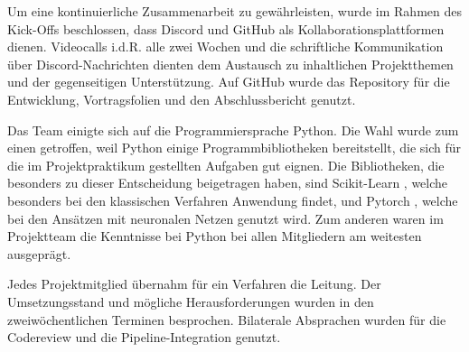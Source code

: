 Um eine kontinuierliche Zusammenarbeit zu gewährleisten, wurde im Rahmen des Kick-Offs beschlossen, dass Discord
und GitHub
als Kollaborationsplattformen dienen. Videocalls i.d.R. alle zwei Wochen und die schriftliche Kommunikation über Discord-Nachrichten dienten dem Austausch zu inhaltlichen Projektthemen und der gegenseitigen Unterstützung. Auf GitHub wurde das Repository \cite{Suxdorf2025Quality} für die Entwicklung, Vortragsfolien und den Abschlussbericht genutzt. %

\label{Programmiersprache}
Das Team einigte sich auf die Programmiersprache Python.
Die Wahl wurde zum einen getroffen, weil Python einige Programmbibliotheken bereitstellt, die sich für die im Projektpraktikum gestellten Aufgaben gut eignen. Die Bibliotheken, die besonders zu dieser Entscheidung beigetragen haben, sind Scikit-Learn \cite{Pedregosa2011}, welche besonders bei den klassischen Verfahren Anwendung findet, und Pytorch \cite{Ansel2024}, welche bei den Ansätzen mit neuronalen Netzen genutzt wird. Zum anderen waren im Projektteam die Kenntnisse bei Python bei allen Mitgliedern am weitesten ausgeprägt. 

Jedes Projektmitglied übernahm für ein Verfahren die Leitung. Der Umsetzungsstand und mögliche Herausforderungen wurden in den zweiwöchentlichen Terminen besprochen. Bilaterale Absprachen wurden für die Codereview und die Pipeline-Integration genutzt. 